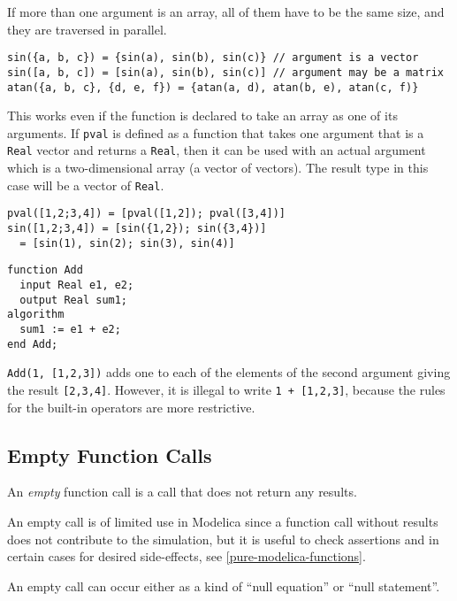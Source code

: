 If more than one argument is an array, all of them have to be the same
size, and they are traversed in parallel.

\begin{example}
\begin{lstlisting}[language=modelica]
sin({a, b, c}) = {sin(a), sin(b), sin(c)} // argument is a vector
sin([a, b, c]) = [sin(a), sin(b), sin(c)] // argument may be a matrix
atan({a, b, c}, {d, e, f}) = {atan(a, d), atan(b, e), atan(c, f)}
\end{lstlisting}
This works even if the function is declared to take an array as
one of its arguments. If \lstinline!pval! is defined as a function that takes
one argument that is a \lstinline!Real! vector and returns a \lstinline!Real!, then it can
be used with an actual argument which is a two-dimensional array (a
vector of vectors). The result type in this case will be a vector of
\lstinline!Real!.
\begin{lstlisting}[language=modelica]
pval([1,2;3,4]) = [pval([1,2]); pval([3,4])]
sin([1,2;3,4]) = [sin({1,2}); sin({3,4})]
  = [sin(1), sin(2); sin(3), sin(4)]
\end{lstlisting}
\begin{lstlisting}[language=modelica]
function Add
  input Real e1, e2;
  output Real sum1;
algorithm
  sum1 := e1 + e2;
end Add;
\end{lstlisting}
\lstinline!Add(1, [1,2,3])! adds one to each of the elements of the second
argument giving the result \lstinline![2,3,4]!. However, it is illegal to
write \lstinline!1 + [1,2,3]!, because the rules for the built-in
operators are more restrictive.
\end{example}

\subsection{Empty Function Calls}\label{empty-function-calls}

An \emph{empty} function call is a call that does not return any results.

\begin{nonnormative}
An empty call is of limited use in Modelica since a function call without results does not contribute to the simulation,
but it is useful to check assertions and in certain cases for desired side-effects, see \cref{pure-modelica-functions}.
\end{nonnormative}

An empty call can occur either as a kind of ``null equation'' or ``null statement''.

